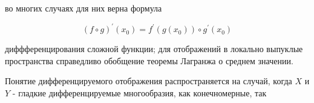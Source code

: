 \documentclass[10pt]{article}
\begin{document}
во многих случаях для них верна формула



\[

(f \circ g)^{\prime}\left(x_{0}\right)=f^{\prime}\left(g\left(x_{0}\right)\right) \circ g^{\prime}\left(x_{0}\right)

\]



диффференцирования сложной функции; для отображений в локально выпуклые пространства справедливо обобщение теоремы Лагранжа о среднем значении.



Понятие дифференцируемого отображения распространяется на случай, когда $X$ и $Y$ - гладкие дифференцируемые многообразия, как конечномерные, так
\end{document}
